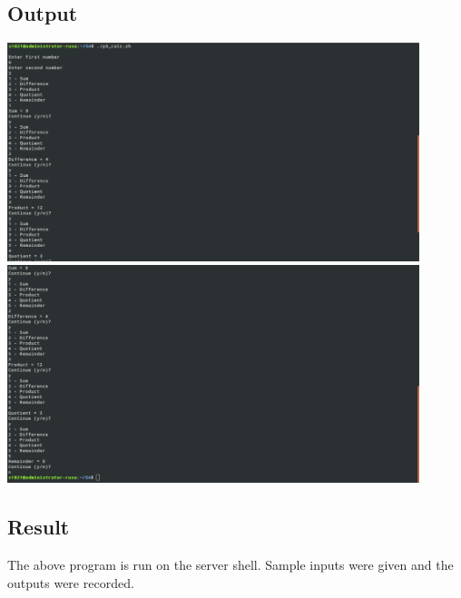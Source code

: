 \documentclass{article}
\begin{document}
\subsection{Output}
\includegraphics[width=0.9\textwidth]{img/p6/ss1.png}\newline
\includegraphics[width=0.9\textwidth]{img/p6/ss2.png}\newline

\subsection{Result}
The above program is run on the server shell. Sample inputs were given and the outputs were recorded.
\end{document}

